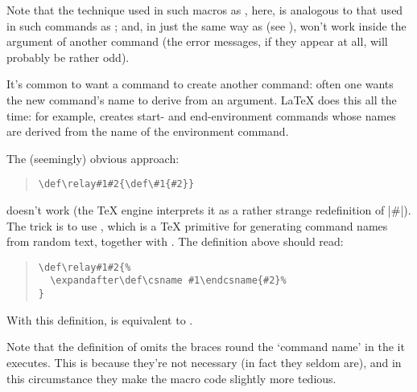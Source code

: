 Note that the technique used in such macros as , here, is
analogous to that used in such commands as ; and, in just the
same way as  (see
),
 won't work inside the argument of another command (the
error messages, if they appear at all, will probably be rather odd).



It's common to want a command to create another command: often one
wants the new command's name to derive from an argument.  \LaTeX{}
does this all the time: for example,  creates
start- and end-environment commands whose names are derived from the
name of the environment command.

The (seemingly) obvious approach:
\begin{quote}
\begin{verbatim}
\def\relay#1#2{\def\#1{#2}}
\end{verbatim}
\end{quote}
doesn't work (the \TeX{} engine interprets it
as a rather strange redefinition of |\#|).  The trick is to use
, which is a \TeX{} primitive for generating command names
from random text, together with .  The definition
above should read:
\begin{quote}
\begin{verbatim}
\def\relay#1#2{%
  \expandafter\def\csname #1\endcsname{#2}%
}
\end{verbatim}
\end{quote}
With this definition,  is equivalent to
.

Note that the definition of  omits the braces round the
`command name' in the  it executes.  This is
because they're not necessary (in fact they seldom are), and in this
circumstance they make the macro code slightly more tedious.

